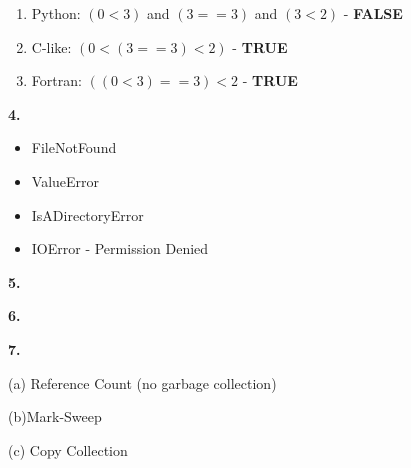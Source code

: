\documentclass[11pt]{article} %
\begin{document}
\begin{enumerate}[label=\alph*.]
\item Python: $(0 < 3)$ and $(3 == 3)$ and $(3 < 2)$ - {\bf FALSE}
\item C-like: $(0 < (3 == 3) < 2)$ - {\bf TRUE}
\item Fortran: $((0 < 3) == 3) < 2$ - {\bf TRUE}
\end{enumerate}


\vskip 0.3in
{\bf 4.}

\begin{itemize}
\item FileNotFound
\item ValueError
\item IsADirectoryError
\item IOError - Permission Denied
\end{itemize}

\newpage
{\bf 5.}
\medskip

\fbox{
	\rule{6.5 in}{0pt}
	\rule[8 in]{0pt}{4ex}
}

\newpage
{\bf 6.}
\medskip

\fbox{
	\rule{6.5 in}{0pt}
	\rule[8 in]{0pt}{4ex}
}

\newpage
{\bf 7.}
\medskip

(a) Reference Count (no garbage collection)\\
\fbox{
	\rule{6.5 in}{0pt}
	\rule[3 in]{0pt}{4ex}
}

\medskip
(b)Mark-Sweep \\
\fbox{
	\rule{6.5 in}{0pt}
	\rule[4 in]{0pt}{4ex}
}

\newpage
(c) Copy Collection \\
\fbox{
	\rule{6.5 in}{0pt}
	\rule[4 in]{0pt}{4ex}
}
\end{document}

